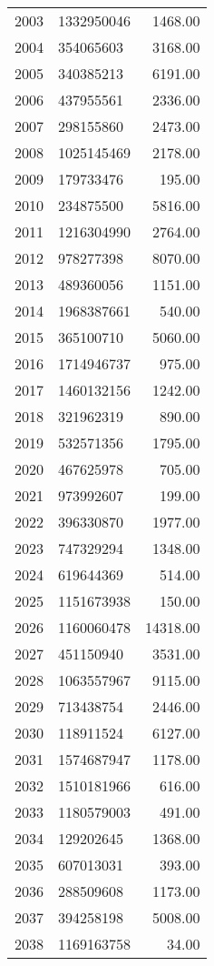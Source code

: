 \begin{table}[ht]
\begin{tabular}{rlr}
  2003 & 1332950046 & 1468.00 \\ 
  2004 & 354065603 & 3168.00 \\ 
  2005 & 340385213 & 6191.00 \\ 
  2006 & 437955561 & 2336.00 \\ 
  2007 & 298155860 & 2473.00 \\ 
  2008 & 1025145469 & 2178.00 \\ 
  2009 & 179733476 & 195.00 \\ 
  2010 & 234875500 & 5816.00 \\ 
  2011 & 1216304990 & 2764.00 \\ 
  2012 & 978277398 & 8070.00 \\ 
  2013 & 489360056 & 1151.00 \\ 
  2014 & 1968387661 & 540.00 \\ 
  2015 & 365100710 & 5060.00 \\ 
  2016 & 1714946737 & 975.00 \\ 
  2017 & 1460132156 & 1242.00 \\ 
  2018 & 321962319 & 890.00 \\ 
  2019 & 532571356 & 1795.00 \\ 
  2020 & 467625978 & 705.00 \\ 
  2021 & 973992607 & 199.00 \\ 
  2022 & 396330870 & 1977.00 \\ 
  2023 & 747329294 & 1348.00 \\ 
  2024 & 619644369 & 514.00 \\ 
  2025 & 1151673938 & 150.00 \\ 
  2026 & 1160060478 & 14318.00 \\ 
  2027 & 451150940 & 3531.00 \\ 
  2028 & 1063557967 & 9115.00 \\ 
  2029 & 713438754 & 2446.00 \\ 
  2030 & 118911524 & 6127.00 \\ 
  2031 & 1574687947 & 1178.00 \\ 
  2032 & 1510181966 & 616.00 \\ 
  2033 & 1180579003 & 491.00 \\ 
  2034 & 129202645 & 1368.00 \\ 
  2035 & 607013031 & 393.00 \\ 
  2036 & 288509608 & 1173.00 \\ 
  2037 & 394258198 & 5008.00 \\ 
  2038 & 1169163758 & 34.00 \\ 

\end{tabular}
\end{table}
